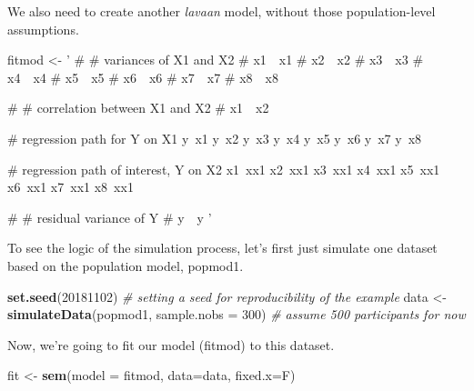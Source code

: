 \documentclass[]{article}
\newenvironment{Shaded}{\begin{snugshade}}{\end{snugshade}}
\newcommand{\KeywordTok}[1]{\textcolor[rgb]{0.13,0.29,0.53}{\textbf{#1}}}
\newcommand{\DataTypeTok}[1]{\textcolor[rgb]{0.13,0.29,0.53}{#1}}
\newcommand{\DecValTok}[1]{\textcolor[rgb]{0.00,0.00,0.81}{#1}}
\newcommand{\StringTok}[1]{\textcolor[rgb]{0.31,0.60,0.02}{#1}}
\newcommand{\CommentTok}[1]{\textcolor[rgb]{0.56,0.35,0.01}{\textit{#1}}}
\newcommand{\NormalTok}[1]{#1}
\begin{document}
We also need to create another \emph{lavaan} model, without those
population-level assumptions.

\begin{Shaded}
\begin{Highlighting}[]
\NormalTok{fitmod <-}\StringTok{ '}
\StringTok{# # variances of X1 and X2}
\StringTok{# x1~~x1}
\StringTok{# x2~~x2}
\StringTok{# x3~~x3}
\StringTok{# x4~~x4}
\StringTok{# x5~~x5}
\StringTok{# x6~~x6}
\StringTok{# x7~~x7}
\StringTok{# x8~~x8}

\StringTok{# # correlation between X1 and X2}
\StringTok{# x1~~x2}

\StringTok{# regression path for Y on X1}
\StringTok{y~x1}
\StringTok{y~x2}
\StringTok{y~x3}
\StringTok{y~x4}
\StringTok{y~x5}
\StringTok{y~x6}
\StringTok{y~x7}
\StringTok{y~x8}

\StringTok{# regression path of interest, Y on X2}
\StringTok{x1~xx1}
\StringTok{x2~xx1}
\StringTok{x3~xx1}
\StringTok{x4~xx1}
\StringTok{x5~xx1}
\StringTok{x6~xx1}
\StringTok{x7~xx1}
\StringTok{x8~xx1}


\StringTok{# # residual variance of Y}
\StringTok{# y~~y}
\StringTok{'}
\end{Highlighting}
\end{Shaded}

To see the logic of the simulation process, let's first just simulate
one dataset based on the population model, popmod1.

\begin{Shaded}
\begin{Highlighting}[]
\KeywordTok{set.seed}\NormalTok{(}\DecValTok{20181102}\NormalTok{)  }\CommentTok{# setting a seed for reproducibility of the example}
\NormalTok{data <-}\StringTok{ }\KeywordTok{simulateData}\NormalTok{(popmod1, }\DataTypeTok{sample.nobs =} \DecValTok{300}\NormalTok{)  }\CommentTok{# assume 500 participants for now}
\end{Highlighting}
\end{Shaded}

Now, we're going to fit our model (fitmod) to this dataset.

\begin{Shaded}
\begin{Highlighting}[]
\NormalTok{fit <-}\StringTok{ }\KeywordTok{sem}\NormalTok{(}\DataTypeTok{model =}\NormalTok{ fitmod, }\DataTypeTok{data=}\NormalTok{data, }\DataTypeTok{fixed.x=}\NormalTok{F)}
\end{Highlighting}
\end{Shaded}
\end{document}
